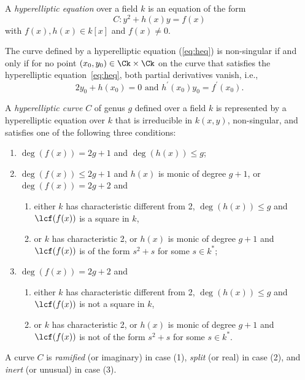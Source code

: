 \bd \label{def:heq}
\cite[Definition~12.4.1]{HandbookFF_2013} A \emph{hyperelliptic
equation} over a field $k$ is an equation of the form 
\begin{equation}
C : y^2 + h(x)y = f(x) \label{eq:heq}
\end{equation}
with $f(x), h(x) \in k[x]$ and $f(x) \not = 0$.
\ed

\br
\cite[Remark~12.4.2]{HandbookFF_2013} The curve defined by a hyperelliptic
equation (\ref{eq:heq}) is non-singular if and only if for no point $(x_0,y_0) \in \Ck \times \Ck$
on the curve that satisfies the hyperelliptic equation~\eqref{eq:heq}, both
partial derivatives vanish, i.e., $$ 2y_0 + h(x_0) = 0 \mbox{ and }
h^{\prime}(x_0)y_0 = f^{\prime}(x_0).$$
\er

\bd \label{def:hec} \cite[Definition~12.4.3]{HandbookFF_2013} A
\emph{hyperelliptic curve} $C$ of genus $g$ defined over a field $k$ is
represented by a hyperelliptic equation over $k$ that is irreducible in
$k(x,y)$, non-singular, and satisfies one of the following three conditions:
\begin{enumerate}
    \item $\deg(f(x)) = 2g + 1$ and $\deg(h(x)) \leq g$;
    \item $\deg(f(x)) \leq 2g + 1$ and $h(x)$ is monic of degree $g + 1$, or
    $\deg(f(x)) = 2g + 2$ and \begin{enumerate}
            \item either $k$ has characteristic different from 2, $\deg(h(x))
            \leq g$ and $\lcf(f(x))$ is a square in $k$,
            \item or $k$ has characteristic 2, or $h(x)$ is monic of degree
            $g+1$ and $\lcf(f(x))$ is of the form $s^2 + s$ for some $s \in
            k^*$;
            \end{enumerate}
    \item $\deg(f(x)) = 2g + 2$ and \begin{enumerate}
        \item either $k$ has characteristic different from 2, $\deg(h(x)) \leq
        g$ and $\lcf(f(x))$ is not a square in $k$,
        \item or $k$ has characteristic 2, or $h(x)$ is monic of degree $g+1$
        and $\lcf(f(x))$ is not of the form $s^2 + s$ for some $s \in k^*$.
    \end{enumerate}
\end{enumerate}

A curve $C$ is \emph{ramified} (or imaginary) in case (1), \emph{split} (or
real) in case (2), and \emph{inert} (or unusual) in case (3).
\ed

